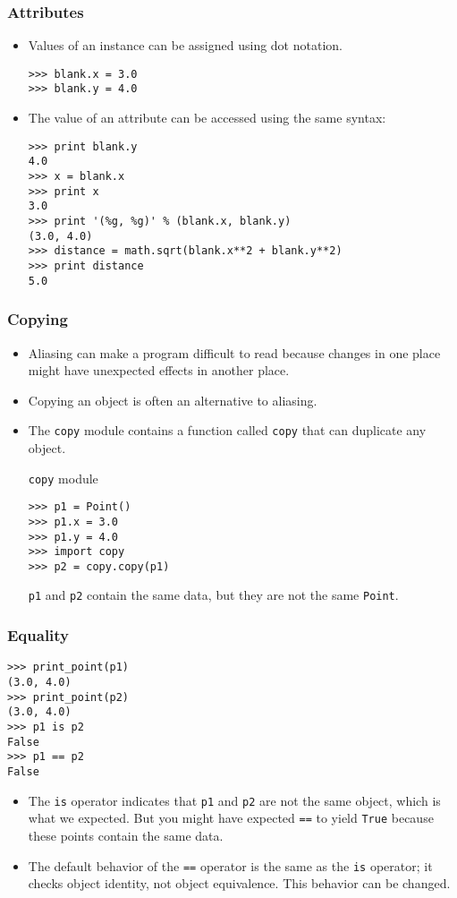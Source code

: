 \documentclass[handout]{beamer}
\newcommand{\beforeverb}{\footnotesize}
\newcommand{\afterverb}{\normalsize}
\begin{document}
\begin{frame}[fragile]
\frametitle{Attributes}
\begin{itemize}
\item Values of an instance can be assigned using dot notation.

\beforeverb
\begin{verbatim}
>>> blank.x = 3.0
>>> blank.y = 4.0
\end{verbatim}
\afterverb

\item The value of an attribute can be accessed using the same syntax:
\begin{block}{}
\beforeverb
\begin{verbatim}
>>> print blank.y
4.0
>>> x = blank.x
>>> print x
3.0
>>> print '(%g, %g)' % (blank.x, blank.y)
(3.0, 4.0)
>>> distance = math.sqrt(blank.x**2 + blank.y**2)
>>> print distance
5.0
\end{verbatim}
\afterverb
\end{block}
%
\end{itemize}
\end{frame}
\begin{frame}[fragile]
\frametitle{Copying}
\begin{itemize}
\item Aliasing can make a program difficult to read because changes
in one place might have unexpected effects in another place.

\item Copying an object is often an alternative to aliasing.
\item The {\tt copy} module contains a function called {\tt copy} that
can duplicate any object.
\begin{block}{{\tt copy} module}
\beforeverb
\begin{verbatim}
>>> p1 = Point()
>>> p1.x = 3.0
>>> p1.y = 4.0
>>> import copy
>>> p2 = copy.copy(p1)
\end{verbatim}
\afterverb
%
 {\tt p1} and {\tt p2} contain the \alert{same data}, but they are
not the same {\tt Point}.
\end{block}
\end{itemize}
\end{frame}
\begin{frame}[fragile]
\frametitle{ Equality}
\begin{block}{}
\beforeverb
\begin{verbatim}
>>> print_point(p1)
(3.0, 4.0)
>>> print_point(p2)
(3.0, 4.0)
>>> p1 is p2
False
>>> p1 == p2
False
\end{verbatim}
\afterverb
\end{block}
%
\begin{itemize}
\item 
The {\tt is} operator indicates that {\tt p1} and {\tt p2} are not the
same object, which is what we expected.  But you might have expected
{\tt ==} to yield {\tt True} because these points contain the same
data. 
 \item The default behavior of the {\tt ==} operator is the same
as the {\tt is} operator; it checks object identity, not object
equivalence.  This behavior can be changed. 
\end{itemize}
\end{frame}
\end{document}
